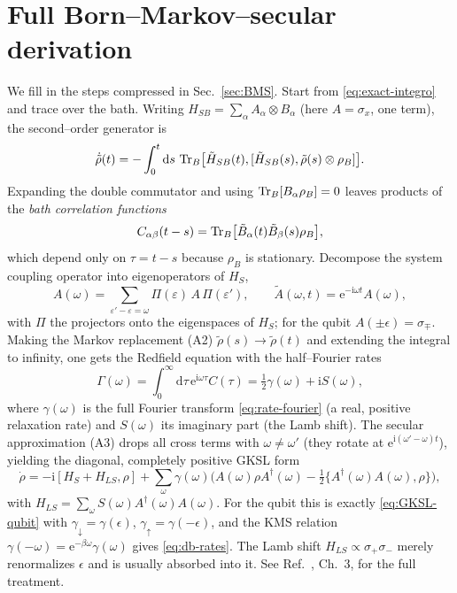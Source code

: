 \documentclass[11pt,a4paper]{article}
\newcommand{\ee}{\mathrm{e}}
\newcommand{\ii}{\mathrm{i}}
\renewcommand{\dd}{\mathrm{d}}
\theoremstyle{definition}
\theoremstyle{remark}
\begin{document}
\section{Full Born--Markov--secular derivation}
\label{app:BMS}
We fill in the steps compressed in Sec.~\ref{sec:BMS}. Start from
\eqref{eq:exact-integro} and trace over the bath. Writing
$H_{SB}=\sum_\alpha A_\alpha\otimes B_\alpha$ (here $A=\sigma_x$, one
term), the second--order generator is
\begin{equation}
\dot{\tilde\rho}(t) = -\int_0^t\dd s\,\Tr_B\!\big[\tilde H_{SB}(t),
[\tilde H_{SB}(s),\tilde\rho(s)\otimes\rho_B]\big].
\end{equation}
Expanding the double commutator and using
$\Tr_B[B_\alpha\rho_B]=0$ leaves products of the \emph{bath correlation
functions}
\begin{equation}
C_{\alpha\beta}(t-s)=\Tr_B\!\big[\tilde B_\alpha(t)\tilde B_\beta(s)
\rho_B\big],
\end{equation}
which depend only on $\tau=t-s$ because $\rho_B$ is stationary. Decompose
the system coupling operator into eigenoperators of $H_S$,
\begin{equation}
A(\omega)=\sum_{\varepsilon'-\varepsilon=\omega}
\Pi(\varepsilon)\,A\,\Pi(\varepsilon'),\qquad
\tilde A(\omega,t)=\ee^{-\ii\omega t}A(\omega),
\end{equation}
with $\Pi$ the projectors onto the eigenspaces of $H_S$; for the qubit
$A(\pm\epsilon)=\sigma_\mp$. Making the Markov replacement (A2)
$\tilde\rho(s)\to\tilde\rho(t)$ and extending the integral to infinity,
one gets the Redfield equation with the half--Fourier rates
\begin{equation}
\Gamma(\omega)=\int_0^\infty\dd\tau\,\ee^{\ii\omega\tau}C(\tau)
= \tfrac12\gamma(\omega)+\ii S(\omega),
\end{equation}
where $\gamma(\omega)$ is the full Fourier transform
\eqref{eq:rate-fourier} (a real, positive relaxation rate) and
$S(\omega)$ its imaginary part (the Lamb shift). The secular
approximation (A3) drops all cross terms with $\omega\neq\omega'$
(they rotate at $\ee^{\ii(\omega'-\omega)t}$), yielding the diagonal,
completely positive GKSL form
\begin{equation}
\dot\rho=-\ii[H_S+H_{LS},\rho]
+\sum_{\omega}\gamma(\omega)\Big(A(\omega)\rho A^\dagger(\omega)
-\tfrac12\{A^\dagger(\omega)A(\omega),\rho\}\Big),
\end{equation}
with $H_{LS}=\sum_\omega S(\omega)A^\dagger(\omega)A(\omega)$. For the
qubit this is exactly \eqref{eq:GKSL-qubit} with
$\gamma_\downarrow=\gamma(\epsilon)$, $\gamma_\uparrow=\gamma(-\epsilon)$,
and the KMS relation $\gamma(-\omega)=\ee^{-\beta\omega}\gamma(\omega)$
gives \eqref{eq:db-rates}. The Lamb shift $H_{LS}\propto\sigma_+\sigma_-$
merely renormalizes $\epsilon$ and is usually absorbed into it. See
Ref.~\cite{Breuer2002}, Ch.~3, for the full treatment.
\end{document}
